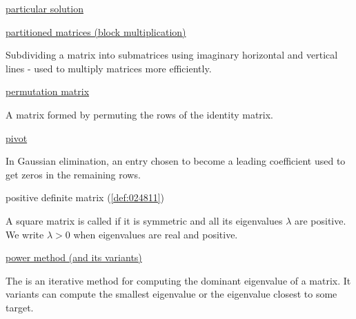 \documentclass{ximera}
\begin{document}
\href{https://ximera.osu.edu/oerlinalg/LinearAlgebra/SYS-0050/main}{particular solution}

\href{https://ximera.osu.edu/oerlinalg/LinearAlgebra/MAT-0023/main}{partitioned matrices (block multiplication)}
\begin{expandable}
    Subdividing a matrix into submatrices using imaginary horizontal and vertical lines - used to multiply matrices more efficiently.
\end{expandable}

\href{https://ximera.osu.edu/oerlinalg/LinearAlgebra/MAT-0070/main}{permutation matrix}
\begin{expandable}
    A matrix formed by permuting the rows of the identity matrix.
\end{expandable}

\href{https://ximera.osu.edu/oerlinalg/LinearAlgebra/SYS-0030/main}{pivot}
\begin{expandable}
    In Gaussian elimination, an entry chosen to become a leading coefficient used to get zeros in the remaining rows.
\end{expandable}

positive definite matrix (\ref{def:024811})
\begin{expandable}
    A square matrix is called  if it is symmetric and all its eigenvalues $\lambda$ are positive.  We write $\lambda>0$ when eigenvalues are real and positive.
\end{expandable}

\href{https://ximera.osu.edu/oerlinalg/LinearAlgebra/EIG-0070/main}{power method (and its variants)}
\begin{expandable}
    The  is an iterative method for computing the dominant eigenvalue of a matrix. It variants can compute the smallest eigenvalue or the eigenvalue closest to some target.
\end{expandable}
\end{document}
